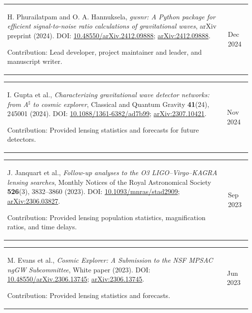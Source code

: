 \documentclass[margin,line]{res}
\begin{document}
\begin{resume}
\begin{tabular}{@{}p{\dimexpr\linewidth-0.62in-3\tabcolsep\relax}p{0.62in}}
    H. Phurailatpam and O. A. Hannuksela, \textit{gwsnr: A Python package for efficient signal-to-noise ratio calculations of gravitational waves}, arXiv preprint (2024). DOI: \href{https://doi.org/10.48550/arXiv.2412.09888}{10.48550/arXiv.2412.09888}; \href{https://arxiv.org/abs/2412.09888}{arXiv:2412.09888}.
    \par\smallskip Contribution: Lead developer, project maintainer and leader, and manuscript writer. & \raggedright Dec 2024
\end{tabular}

\begin{tabular}{@{}p{\dimexpr\linewidth-0.62in-3\tabcolsep\relax}p{0.62in}}
    I. Gupta et al., \textit{Characterizing gravitational wave detector networks: from A$^\sharp$ to cosmic explorer}, Classical and Quantum Gravity \textbf{41}(24), 245001 (2024). DOI: \href{https://doi.org/10.1088/1361-6382/ad7b99}{10.1088/1361-6382/ad7b99}; \href{https://arxiv.org/abs/2307.10421}{arXiv:2307.10421}.
    \par\smallskip Contribution: Provided lensing statistics and forecasts for future detectors. & \raggedright Nov 2024
\end{tabular}

\begin{tabular}{@{}p{\dimexpr\linewidth-0.62in-3\tabcolsep\relax}p{0.62in}}
    J. Janquart et al., \textit{Follow-up analyses to the O3 LIGO--Virgo--KAGRA lensing searches}, Monthly Notices of the Royal Astronomical Society \textbf{526}(3), 3832--3860 (2023). DOI: \href{https://doi.org/10.1093/mnras/stad2909}{10.1093/mnras/stad2909}; \href{https://arxiv.org/abs/2306.03827}{arXiv:2306.03827}.
    \par\smallskip Contribution: Provided lensing population statistics, magnification ratios, and time delays. & \raggedright Sep 2023
\end{tabular}

\begin{tabular}{@{}p{\dimexpr\linewidth-0.62in-3\tabcolsep\relax}p{0.62in}}
    M. Evans et al., \textit{Cosmic Explorer: A Submission to the NSF MPSAC ngGW Subcommittee}, White paper (2023). DOI: \href{https://doi.org/10.48550/arXiv.2306.13745}{10.48550/arXiv.2306.13745}; \href{https://arxiv.org/abs/2306.13745}{arXiv:2306.13745}.
    \par\smallskip Contribution: Provided lensing statistics and forecasts. & \raggedright Jun 2023
\end{tabular}


\end{resume}
\end{document}

